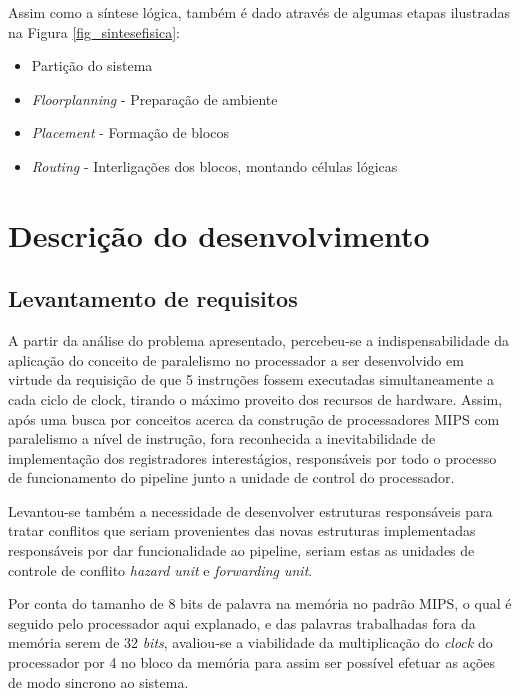 \documentclass[
	11pt,				%
	openany,			%
	oneside,
	a4paper,			%
	chapter=TITLE,		%
	section=TITLE,		%
	english,			%
	brazil				%
	]{abntex2}
\begin{document}
Assim como a síntese lógica, também é dado através de algumas etapas ilustradas na Figura \ref{fig_sintesefisica}:

\begin{itemize}
\item Partição do sistema
\item \textit{Floorplanning} - Preparação de ambiente
\item \textit{Placement} - Formação de blocos
\item \textit{Routing} - Interligações dos blocos, montando células lógicas
\end{itemize}

\chapter{Descrição do desenvolvimento}
\section{Levantamento de requisitos}

A partir da análise do problema apresentado, percebeu-se a indispensabilidade da aplicação do conceito de paralelismo no processador a ser desenvolvido em virtude da requisição de que 5 instruções fossem executadas simultaneamente a cada ciclo de clock, tirando o máximo proveito dos recursos de hardware. Assim, após uma busca por conceitos acerca da construção de processadores MIPS com paralelismo a nível de instrução, fora reconhecida a inevitabilidade de implementação dos registradores interestágios, responsáveis por todo o processo de funcionamento do pipeline junto a unidade de control do processador.  

Levantou-se também a necessidade de desenvolver estruturas responsáveis para tratar conflitos que seriam provenientes das novas estruturas implementadas responsáveis por dar funcionalidade ao pipeline, seriam estas as unidades de controle de conflito \textit{hazard unit} e \textit{forwarding unit}.

Por conta do tamanho de 8 bits de palavra na memória no padrão MIPS, o qual é seguido pelo processador aqui explanado, e das palavras trabalhadas fora da memória serem de 32 \textit{bits}, avaliou-se a viabilidade da multiplicação do \textit{clock} do processador por 4 no bloco da memória para assim ser possível efetuar as ações de modo sincrono ao sistema.
\end{document}
